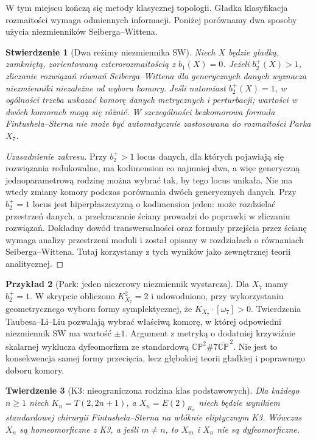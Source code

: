 \documentclass[11pt,a4paper]{report}
\numberwithin{equation}{section}
\theoremstyle{plain}
\newtheorem{twierdzenie}{Twierdzenie}[section]
\newtheorem{stwierdzenie}[twierdzenie]{Stwierdzenie}
\theoremstyle{definition}
\newtheorem{przyklad}[twierdzenie]{Przykład}
\theoremstyle{remark}
\begin{document}
W tym miejscu kończą się metody klasycznej topologii.
Gładka klasyfikacja rozmaitości wymaga odmiennych informacji.
Poniżej porównamy dwa sposoby użycia niezmienników
Seiberga--Wittena.

\begin{stwierdzenie}[Dwa reżimy niezmiennika SW]
\label{prop:tg-syn-regimes}
Niech $X$ będzie gładką, zamkniętą, zorientowaną
czterorozmaitością z $b_1(X)=0$.
Jeżeli $b_2^+(X)>1$, zliczanie rozwiązań równań
Seiberga--Wittena dla generycznych danych wyznacza
niezmienniki niezależne od wyboru komory. Jeśli natomiast
$b_2^+(X)=1$, w ogólności trzeba wskazać komorę
danych metrycznych i perturbacji; wartości w dwóch
komorach mogą się różnić. W szczególności bezkomorowa
formuła Fintushela--Sterna nie może być automatycznie
zastosowana do rozmaitości Parka $X_7$.
\end{stwierdzenie}

\begin{proof}[Uzasadnienie zakresu]
Przy $b_2^+>1$ locus danych, dla których pojawiają się
rozwiązania redukowalne, ma kodimension co najmniej dwa,
a więc generyczną jednoparametrową rodzinę można wybrać
tak, by tego locus unikała. Nie ma wtedy zmiany komory
podczas porównania dwóch generycznych danych.
Przy $b_2^+=1$ locus jest hiperpłaszczyzną o kodimension jeden:
może rozdzielać przestrzeń danych, a przekraczanie ściany
prowadzi do poprawki w zliczaniu rozwiązań.
Dokładny dowód transwersalności oraz formuły przejścia przez
ścianę wymaga analizy przestrzeni moduli i został opisany
w rozdziałach o równaniach Seiberga--Wittena. Tutaj korzystamy
z tych wyników jako zewnętrznej teorii analitycznej.
\end{proof}

\begin{przyklad}[Park: jeden niezerowy niezmiennik wystarcza]
Dla $X_7$ mamy $b_2^+=1$. W skrypcie obliczono
$K_{X_7}^2=2$ i udowodniono, przy wykorzystaniu
geometrycznego wyboru formy symplektycznej, że
$K_{X_7}\cdot[\omega_7]>0$. Twierdzenia Taubesa--Li--Liu
pozwalają wybrać właściwą komorę, w której odpowiedni
niezmiennik SW ma wartość $\pm1$. Argument z metryką
o dodatniej krzywiźnie skalarnej wyklucza dyfeomorfizm
ze standardową $\mathbb{CP}^2\#7\overline{\mathbb{CP}}^{\,2}$.
Nie jest to konsekwencja samej formy przecięcia, lecz
głębokiej teorii gładkiej i poprawnego doboru komory.
\end{przyklad}

\begin{twierdzenie}[K3: nieograniczona rodzina klas podstawowych]
\label{thm:tg-syn-k3}
Dla każdego $n\ge1$ niech $K_n=T(2,2n+1)$,
a $X_n=E(2)_{K_n}$ niech będzie wynikiem standardowej
chirurgii Fintushela--Sterna na włóknie eliptycznym K3.
Wówczas $X_n$ są homeomorficzne z K3, a jeśli $m\ne n$,
to $X_m$ i $X_n$ nie są dyfeomorficzne.
\end{twierdzenie}
\end{document}
